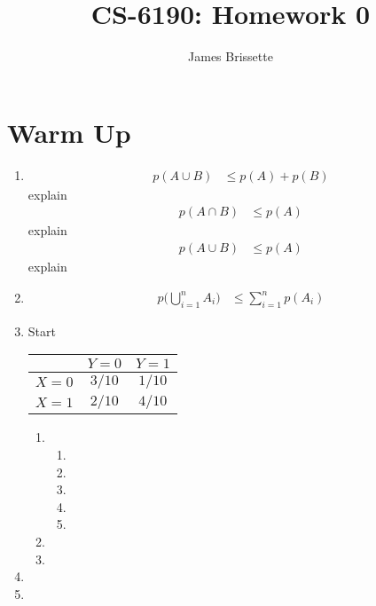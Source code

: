 \documentclass[11pt,a4paper]{article}
\author{James Brissette}
\title{CS-6190: Homework 0}
\begin{document}
	\maketitle
	
	\section{Warm Up}
		\begin{enumerate}
			\item
			\begin{align*}
				p(A \cup B) &\leq p(A) + p(B)
			\end{align*}
			explain
			\begin{align*}
				p(A \cap B) &\leq p(A)
			\end{align*}
			explain
			\begin{align*}
				p(A \cup B) &\leq p(A)
			\end{align*}
			explain
		
	
			\item 
			\begin{align*}
				p\Big(\bigcup_{i=1}^{n} A_i \Big) &\leq \sum_{i=1}^{n} p(A_i)
			\end{align*}
			
			\item Start
			\begin{table}[h]        
				\centering
				\begin{tabular}{ccc}
				\hline\hline
				& $Y=0$ & $Y=1$ \\ \hline
				$X=0$ & $3/10$ & $1/10$ \\ \hline
				$X=1$  & $2/10$ & $4/10$ \\ \hline\hline
				\end{tabular}
			\end{table}
			
			\begin{enumerate}
				\item
				\begin{enumerate}
					\item
					\item
					\item
					\item
					\item
				\end{enumerate}
				\item
				\item
			\end{enumerate}
			\item
			\item
		\end{enumerate}
\end{document}
